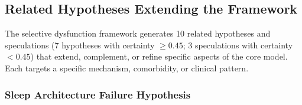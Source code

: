 \subsection{Related Hypotheses Extending the Framework}
\label{subsec:related-hypotheses}

The selective dysfunction framework generates 10 related hypotheses and speculations (7 hypotheses with certainty $\geq 0.45$; 3 speculations with certainty $< 0.45$) that extend, complement, or refine specific aspects of the core model. Each targets a specific mechanism, comorbidity, or clinical pattern.

\subsubsection{Sleep Architecture Failure Hypothesis}

